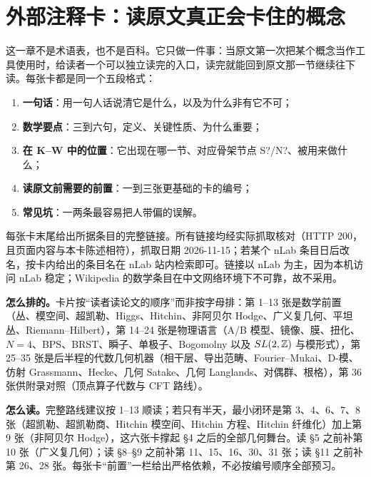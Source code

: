 
\section{外部注释卡：读原文真正会卡住的概念}

这一章不是术语表，也不是百科。它只做一件事：当原文第一次把某个概念当作工具使用时，给读者一个可以独立读完的入口，读完就能回到原文那一节继续往下读。每张卡都是同一个五段格式：

\begin{enumerate}[label=\arabic*.,leftmargin=1.8em,itemsep=1pt]
  \item \textbf{一句话}：用一句人话说清它是什么，以及为什么非有它不可；
  \item \textbf{数学要点}：三到六句，定义、关键性质、为什么重要；
  \item \textbf{在 K--W 中的位置}：它出现在哪一节、对应骨架节点 S?/N?、被用来做什么；
  \item \textbf{读原文前需要的前置}：一到三张更基础的卡的编号；
  \item \textbf{常见坑}：一两条最容易把人带偏的误解。
\end{enumerate}

每张卡末尾给出所据条目的完整链接。所有链接均经实际抓取核对（HTTP 200，且页面内容与本卡陈述相符），抓取日期 2026-11-15；若某个 nLab 条目日后改名，按卡内给出的条目名在 nLab 站内检索即可。链接以 nLab 为主，因为本机访问 nLab 稳定；Wikipedia 的数学条目在中文网络环境下不可靠，故不采用。

\textbf{怎么排的。}卡片按“读者读论文的顺序”而非按字母排：第 1--13 张是数学前置（丛、模空间、超凯勒、Higgs、Hitchin、非阿贝尔 Hodge、广义复几何、平坦丛、Riemann--Hilbert），第 14--24 张是物理语言（A/B 模型、镜像、膜、扭化、$N=4$、BPS、BRST、瞬子、单极子、Bogomolny 以及 $SL(2,\mathbb{Z})$ 与模形式），第 25--35 张是后半程的代数几何机器（相干层、导出范畴、Fourier--Mukai、D-模、仿射 Grassmann、Hecke、几何 Satake、几何 Langlands、对偶群、根格），第 36 张供附录对照（顶点算子代数与 CFT 路线）。

\textbf{怎么读。}完整路线建议按 1--13 顺读；若只有半天，最小闭环是第 3、4、6、7、8 张（超凯勒、超凯勒商、Hitchin 模空间、Hitchin 方程、Hitchin 纤维化）加上第 9 张（非阿贝尔 Hodge），这六张卡撑起 §4 之后的全部几何舞台。读 §5 之前补第 10 张（广义复几何）；读 §8--§9 之前补第 11、15、16、30、31 张；读 §11 之前补第 26、28 张。每张卡“前置”一栏给出严格依赖，不必按编号顺序全部预习。

